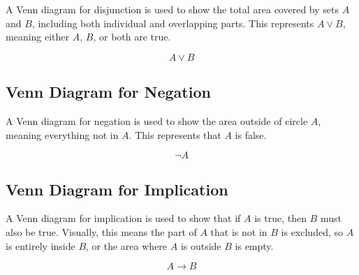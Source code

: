 \documentclass[12pt,a4paper,openany]{article}
\begin{document}
A Venn diagram for disjunction is used to show the total area covered by sets \(A\) and \(B\), including both individual and overlapping parts. This represents \(A \vee B\), meaning either \(A\), \(B\), or both are true.

\[
A \vee B
\]

\begin{center}
\end{center}

\subsection{Venn Diagram for Negation}\label{ven-diagram-for-negation}

A Venn diagram for negation is used to show the area outside of circle \(A\), meaning everything not in \(A\). This represents that \(A\) is false.

\[
\neg A
\]

\begin{center}
\end{center}

\subsection{Venn Diagram for Implication}\label{venn-diagram-for-implication}

A Venn diagram for implication is used to show that if \(A\) is true, then \(B\) must also be true. Visually, this means the part of \(A\) that is not in \(B\) is excluded, so \(A\) is entirely inside \(B\), or the area where \(A\) is outside \(B\) is empty.

\[
A \to B
\]

\begin{center}
\end{center}
\end{document}
